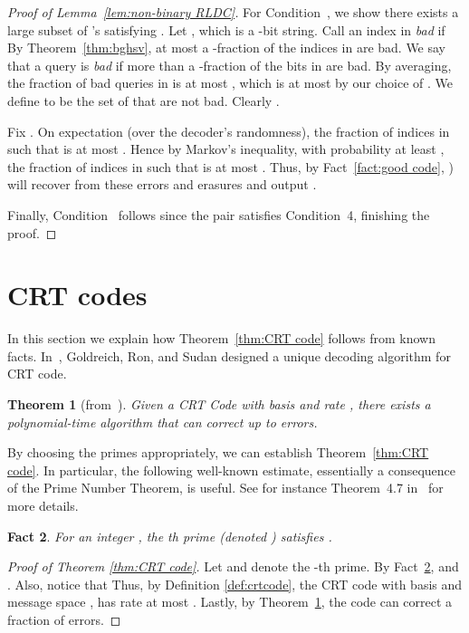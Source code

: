 \documentclass[11pt,english]{article}
\newtheorem{theorem}{Theorem}
\newtheorem{fact}[theorem]{Fact}
\theoremstyle{definition}
\theoremstyle{remark}
\begin{document}
\begin{proof}[Proof of Lemma~\ref{lem:non-binary RLDC}]
For Condition~, we show there exists a large subset  of 's
satisfying . Let ,
which is a -bit string. Call an index  in  \emph{bad}
if  By Theorem~\ref{thm:bghsv},
at most a -fraction of the indices in  are bad.
We say that a query  is \emph{bad} if more than a -fraction
of the bits in  are bad. By averaging, the fraction of bad queries in  is at most 
, which is at most  by our choice of . 
We define  to be the set of  that are not bad. Clearly .

Fix . On expectation (over the decoder's randomness), the fraction of indices
in  such that  is at most . 
Hence by Markov's inequality,
with probability at least , the fraction
of indices in  such that  is at most . 
Thus, by Fact~\ref{fact:good code}, ) will recover from these
errors and erasures and output .

Finally, Condition~ follows since the pair 
satisfies Condition~4, finishing the proof.
\end{proof} 

\section{CRT codes\label{sec:CRT-code}}

In this section we explain how Theorem~\ref{thm:CRT code} follows from known facts.
In~\cite{grs:crt-errors}, Goldreich, Ron, and Sudan
designed a unique decoding algorithm for CRT code. 

\begin{theorem}[from~\cite{grs:crt-errors}]\label{thm:CRT decoding}
Given a CRT Code with basis  and rate ,
there exists a polynomial-time algorithm that can correct up to 
errors. 
\end{theorem}

By choosing the primes appropriately, we can establish Theorem~\ref{thm:CRT code}.
In particular, the following well-known estimate, essentially a consequence
of the Prime Number Theorem, is useful. See for instance Theorem~4.7
in~\cite{apostol} for more details.

\begin{fact}\label{fact:Prime Number Theorem} For an integer
, the th prime (denoted ) satisfies .
\end{fact}

\begin{proof}[Proof of Theorem \ref{thm:CRT code}] Let 
and  denote the -th prime. By Fact~\ref{fact:Prime Number Theorem},
 and .
Also, notice that 
Thus, by Definition \ref{def:crtcode}, the CRT code with basis  and message space , has rate at most .
Lastly, by Theorem~\ref{thm:CRT decoding}, the code can correct a fraction
 of errors.
\end{proof}
\end{document}
